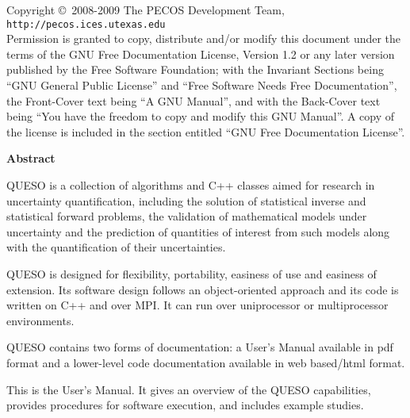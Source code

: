 \clearpage
\thispagestyle{empty}
$~$\\
\vfill
Copyright \copyright\ 2008-2009 The PECOS Development Team, \texttt{http://pecos.ices.utexas.edu}\\
Permission is granted to copy, distribute and/or modify this document under the terms of
the GNU Free Documentation License, Version 1.2 or any later version published by the Free
Software Foundation; with the Invariant Sections being ``GNU General Public License'' and
``Free Software Needs Free Documentation'', the Front-Cover text being ``A GNU Manual'',
and with the Back-Cover text being ``You have the freedom to copy and modify this GNU Manual''.
A copy of the license is included in the section entitled ``GNU Free Documentation License''.

\clearpage
\centerline{\Large\bf Abstract}
$~$\\
QUESO is a collection of algorithms and C++ classes aimed for
research in uncertainty quantification,
including
the solution of statistical inverse and statistical forward problems,
the validation of mathematical models under uncertainty and
the prediction of quantities of interest from such models along with
the quantification of their uncertainties.

QUESO is designed for flexibility, portability, easiness of use and
easiness of extension. Its software design follows an object-oriented
approach and its code is written on C++ and over MPI. It can run over
uniprocessor or multiprocessor environments.

QUESO contains two forms of documentation:
a User's Manual available in pdf format
and
a lower-level code documentation available in web based/html format.

This is the User's Manual.
It gives an overview of the QUESO capabilities,
provides procedures for software execution, and includes example studies.

\clearpage
$~$\\


